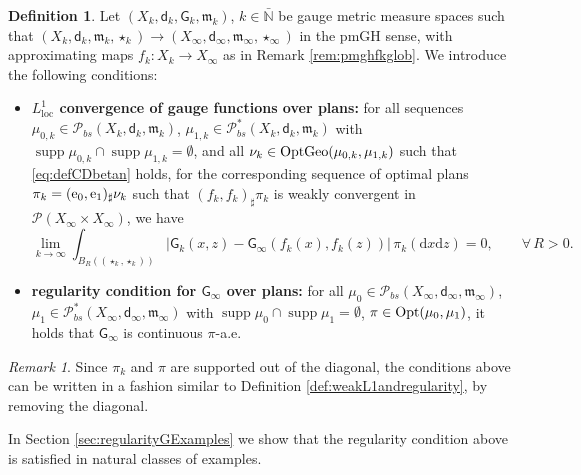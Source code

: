 \documentclass[11pt,a4paper]{article}
\theoremstyle{plain}
\theoremstyle{definition}
\newtheorem{definition}[theorem]{Definition}
\theoremstyle{remark}
\newtheorem{remark}[theorem]{Remark}
\numberwithin{equation}{section}
\newcommand{\N}{\mathbb{N}} %
\DeclareMathOperator{\supp}{\mathrm{supp}}
\newcommand{\OptGeo}{{\rm OptGeo}}
\newcommand{\Opt}{{\rm Opt}}
\newcommand{\loc}{\mathrm{loc}}
\newcommand{\Prob}{\mathcal{P}}
\newcommand{\di}{\mathrm{d}}
\newcommand{\mm}{\mathfrak m}
\newcommand{\ee}{{\rm e}}
\newcommand{\sfd}{\mathsf d}
\newcommand{\sfG}{\mathsf G}
\begin{document}
\begin{definition}\label{def:weakL1andregularity-CD}
Let $(X_k, \sfd_k,\sfG_k,\mm_k)$, $k\in \bar{\N}$ be gauge metric measure spaces such that $(X_k, \sfd_k,\mm_k,\star_k) \to (X_\infty,\sfd_\infty,\mm_\infty,\star_\infty)$ in the pmGH sense, with approximating maps $f_k:X_k \to X_\infty$  as in Remark \ref{rem:pmghfkglob}. We introduce the following conditions:
\begin{itemize}
\item \textbf{$L^1_{\loc}$ convergence of gauge functions over plans:}
 for all sequences $\mu_{0,k}\in \mathcal{P}_{bs}(X_k,\sfd_k,\mm_k)$, $\mu_{1,k}\in \Prob_{bs}^{*}(X_{k}, \sfd_{k}, \mm_{k})$  with $\supp\mu_{0,k}\cap \supp\mu_{1,k}=\emptyset$,  and all $\nu_k\in \OptGeo(\mu_{0,k},\mu_{1,k})$ such that \eqref{eq:defCDbetan} holds, for the corresponding sequence of optimal plans $\pi_k = (\ee_0,\ee_1)_\sharp \nu_k$ such that $(f_k,f_k)_\sharp\pi_k$ is weakly convergent in $\mathcal{P}(X_\infty\times X_\infty)$, we have
\begin{equation}\label{eq:weakL1condition-CD}
\lim_{k\to \infty}\int_{B_R((\star_k,\star_k))}|\sfG_k(x,z)-\sfG_\infty(f_k(x),f_k(z))| \, \pi_k(\di x \di z) =0, \qquad \forall\, R>0.
\end{equation}
\item \textbf{regularity condition for $\sfG_\infty$ over plans:} for all $\mu_{0}\in \mathcal{P}_{bs}(X_\infty,\sfd_\infty,\mm_\infty)$, $\mu_{1}\in \Prob_{bs}^{*}(X_{\infty}, \sfd_{\infty}, \mm_{\infty})$  with $\supp \mu_{0}\cap \supp \mu_{1}=\emptyset$, $\pi \in \Opt(\mu_0,\mu_1)$, it holds that $\sfG_\infty$ is continuous $\pi$-a.e.
\end{itemize}
\end{definition}
\begin{remark}
Since $\pi_k$ and $\pi$ are supported out of the diagonal, the conditions above can be written in a fashion similar to Definition \ref{def:weakL1andregularity}, by removing the diagonal.
\end{remark}
In Section \ref{sec:regularityGExamples} we show that the regularity condition above is satisfied in natural classes of examples.
\end{document}

